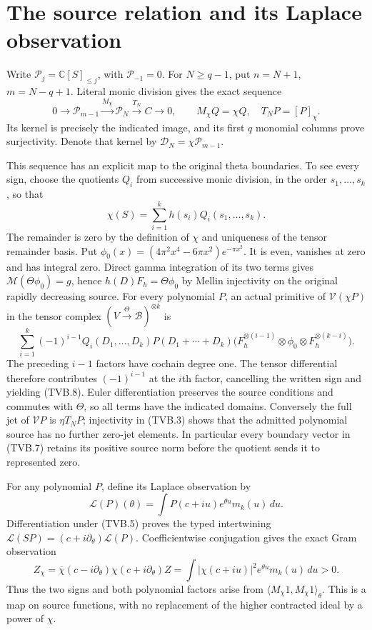 \documentclass[11pt]{article}
\newcommand{\C}{\mathbb C}
\begin{document}
\section{The source relation and its Laplace observation}

Write $\mathcal P_j=\C[S]_{\le j}$, with $\mathcal P_{-1}=0$.
For $N\ge q-1$, put $n=N+1$, $m=N-q+1$. Literal monic division
gives the exact sequence
\[
 0\longrightarrow\mathcal P_{m-1}
 \xrightarrow{M_\chi}\mathcal P_N
 \xrightarrow{T_N}C\longrightarrow0,
 \qquad M_\chi Q=\chi Q,\quad T_NP=[P]_\chi.
 \tag{TVB.7}
\]
Its kernel is precisely the indicated image, and its first $q$
monomial columns prove surjectivity. Denote that kernel by
$\mathcal D_N=\chi\mathcal P_{m-1}$.

This sequence has an explicit map to the original theta boundaries.
To see every sign, choose the quotients $Q_i$ from successive monic
division, in the order $s_1,\ldots,s_k$, so that
\[
 \chi(S)=\sum_{i=1}^k h(s_i)Q_i(s_1,\ldots,s_k).
 \tag{TVB.8}
\]
The remainder is zero by the definition of $\chi$ and uniqueness of
the tensor remainder basis. Put
$\phi_0(x)=(4\pi^2x^4-6\pi x^2)e^{-\pi x^2}$.
It is even, vanishes at zero and has integral zero. Direct gamma
integration of its two terms gives
$\mathcal M(\Theta\phi_0)=g$, hence
$h(D)F_h=\Theta\phi_0$ by Mellin injectivity on the original
rapidly decreasing source. For every polynomial $P$, an actual
primitive of $\mathcal V(\chi P)$ in the tensor complex
$(V\xrightarrow{\Theta}\mathscr B)^{\otimes k}$ is
\[
 \sum_{i=1}^k(-1)^{i-1}Q_i(D_1,\ldots,D_k)P(D_1+\cdots+D_k)
 \bigl(F_h^{\otimes(i-1)}\otimes\phi_0
             \otimes F_h^{\otimes(k-i)}\bigr).
 \tag{TVB.9}
\]
The preceding $i-1$ factors have cochain degree one. The tensor
differential therefore contributes $(-1)^{i-1}$ at the $i$th
factor, cancelling the written sign and yielding (TVB.8).
Euler differentiation preserves the source conditions and commutes
with $\Theta$, so all terms have the indicated domains. Conversely
the full jet of $\mathcal VP$ is $\eta T_NP$; injectivity in
(TVB.3) shows that the admitted polynomial source has no further
zero-jet elements. In particular every boundary vector in (TVB.7)
retains its positive source norm before the quotient sends it to
represented zero.

For any polynomial $P$, define its Laplace observation by
\[
 \mathscr L(P)(\theta)=\int P(c+iu)e^{\theta u}m_k(u)\,du.
\]
Differentiation under (TVB.5) proves the typed intertwining
$\mathscr L(SP)=(c+i\partial_\theta)\mathscr L(P)$.
Coefficientwise conjugation gives the exact Gram observation
\[
 Z_\chi
 =\overline\chi(c-i\partial_\theta)\chi(c+i\partial_\theta)Z
 =\int|\chi(c+iu)|^2e^{\theta u}m_k(u)\,du>0.
 \tag{TVB.10}
\]
Thus the two signs and both polynomial factors arise from
$\langle M_\chi1,M_\chi1\rangle_\theta$.
This is a map on source functions, with no replacement of the
higher contracted ideal by a power of $\chi$.
\end{document}
